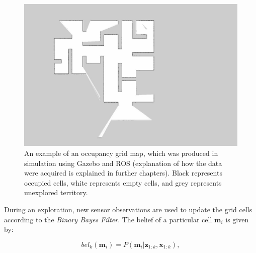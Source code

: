 \begin{figure}[H]
	\centering
	\includegraphics[width=0.7\linewidth]{figs/example_of_occupancy_grid}
	\caption[An example of an occupancy grid map]{An example of an occupancy grid map, which was produced in simulation using Gazebo and ROS (explanation of how the data were acquired is explained in further chapters). Black represents occupied cells, white represents empty cells, and grey represents unexplored territory.}
	\label{fig:exampleofoccupancygrid}
\end{figure}

During an exploration, new sensor observations are used to update the grid cells according to the \textit{Binary Bayes Filter}. The belief of a particular cell \(\mathbf{m}_i\) is given by:

\begin{equation}
    bel_{k}(\mathbf{m}_i) = P(\mathbf{m}_i|\mathbf{z}_{1:k},\mathbf{x}_{1:k}),
\end{equation}


